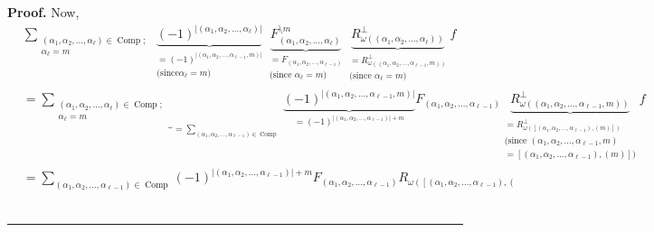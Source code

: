 \documentclass[numbers=enddot,12pt,final,onecolumn,notitlepage,abstracton]{scrartcl}%
\theoremstyle{definition}
\newenvironment{proof}[1][Proof]{\noindent\textbf{#1.} }{\ \rule{0.5em}{0.5em}}
\newenvironment{verlong}{}{}
\let\sumnonlimits\sum
\renewcommand{\sum}{\sumnonlimits\limits}
\begin{document}
\begin{verlong}
\begin{proof}
Now,%
\begin{align}
&  \sum_{\substack{\left(  \alpha_{1},\alpha_{2},\ldots,\alpha_{\ell}\right)
\in\operatorname*{Comp};\\\alpha_{\ell}=m}}\underbrace{\left(  -1\right)
^{\left\vert \left(  \alpha_{1},\alpha_{2},\ldots,\alpha_{\ell}\right)
\right\vert }}_{\substack{=\left(  -1\right)  ^{\left\vert \left(  \alpha
_{1},\alpha_{2},\ldots,\alpha_{\ell-1},m\right)  \right\vert }\\\text{(since
}\alpha_{\ell}=m\text{)}}}\underbrace{F_{\left(  \alpha_{1},\alpha_{2}%
,\ldots,\alpha_{\ell}\right)  }^{\setminus m}}_{\substack{=F_{\left(
\alpha_{1},\alpha_{2},\ldots,\alpha_{\ell-1}\right)  }\\\text{(since }%
\alpha_{\ell}=m\text{)}}}\underbrace{R_{\omega\left(  \left(  \alpha
_{1},\alpha_{2},\ldots,\alpha_{\ell}\right)  \right)  }^{\perp}}%
_{\substack{=R_{\omega\left(  \left(  \alpha_{1},\alpha_{2},\ldots
,\alpha_{\ell-1},m\right)  \right)  }^{\perp}\\\text{(since }\alpha_{\ell
}=m\text{)}}}f\nonumber\\
&  =\underbrace{\sum_{\substack{\left(  \alpha_{1},\alpha_{2},\ldots
,\alpha_{\ell}\right)  \in\operatorname*{Comp};\\\alpha_{\ell}=m}}}%
_{=\sum_{\left(  \alpha_{1},\alpha_{2},\ldots,\alpha_{\ell-1}\right)
\in\operatorname*{Comp}}}\underbrace{\left(  -1\right)  ^{\left\vert \left(
\alpha_{1},\alpha_{2},\ldots,\alpha_{\ell-1},m\right)  \right\vert }%
}_{=\left(  -1\right)  ^{\left\vert \left(  \alpha_{1},\alpha_{2}%
,\ldots,\alpha_{\ell-1}\right)  \right\vert +m}}F_{\left(  \alpha_{1}%
,\alpha_{2},\ldots,\alpha_{\ell-1}\right)  }\underbrace{R_{\omega\left(
\left(  \alpha_{1},\alpha_{2},\ldots,\alpha_{\ell-1},m\right)  \right)
}^{\perp}}_{\substack{=R_{\omega\left(  \left[  \left(  \alpha_{1},\alpha
_{2},\ldots,\alpha_{\ell-1}\right)  ,\left(  m\right)  \right]  \right)
}^{\perp}\\\text{(since }\left(  \alpha_{1},\alpha_{2},\ldots,\alpha_{\ell
-1},m\right)  \\=\left[  \left(  \alpha_{1},\alpha_{2},\ldots,\alpha_{\ell
-1}\right)  ,\left(  m\right)  \right]  \text{)}}}f\nonumber\\
&  =\sum_{\left(  \alpha_{1},\alpha_{2},\ldots,\alpha_{\ell-1}\right)
\in\operatorname*{Comp}}\left(  -1\right)  ^{\left\vert \left(  \alpha
_{1},\alpha_{2},\ldots,\alpha_{\ell-1}\right)  \right\vert +m}F_{\left(
\alpha_{1},\alpha_{2},\ldots,\alpha_{\ell-1}\right)  }R_{\omega\left(  \left[
\left(  \alpha_{1},\alpha_{2},\ldots,\alpha_{\ell-1}\right)  ,\left(
}
\end{align}
\end{proof}
\end{verlong}
\end{document}
